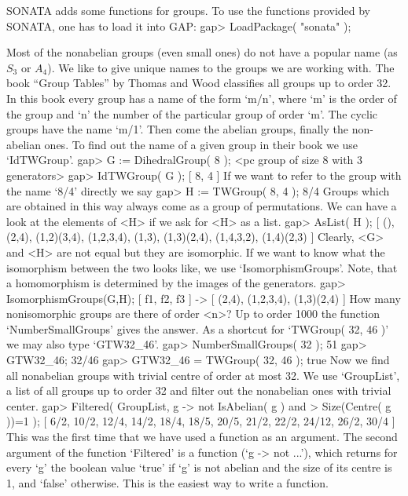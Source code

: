 %
%

SONATA adds some functions for groups. To use the functions provided by
SONATA, one has to load it into GAP:
\beginexample
    gap> LoadPackage( "sonata" );
\endexample



        Most of the nonabelian groups (even small ones) do not have a
        popular name (as $S_3$ or $A_4$). We like to give unique names to
        the groups we are working with. The book ``Group Tables'' by
        Thomas and Wood classifies all groups up to order 32. In this book
        every group has a name of the form `m/n', where `m' is the order of
        the group and `n' the number of the particular group of order `m'.
        The cyclic groups have the name `m/1'. Then come the abelian groups,
        finally the non-abelian ones. To find out the name of a given group
        in their book we use `IdTWGroup'. 
\beginexample
    gap> G := DihedralGroup( 8 );     
    <pc group of size 8 with 3 generators>
    gap> IdTWGroup( G );
    [ 8, 4 ]
\endexample
        If we want to refer to the group with the name `8/4' directly we
        say
\beginexample
    gap> H := TWGroup( 8, 4 );
    8/4
\endexample
        Groups which are obtained in this way always come as a group of
        permutations. We can have a look at the elements of <H> if we ask
        for <H> as a list.
\beginexample
    gap> AsList( H );
    [ (), (2,4), (1,2)(3,4), (1,2,3,4), (1,3), (1,3)(2,4), (1,4,3,2), 
      (1,4)(2,3) ]
\endexample
        Clearly, <G> and <H> are not equal but they are isomorphic. If we want
        to know what the isomorphism between the two looks like, we use
        `IsomorphismGroups'. Note, that a homomorphism is determined by the
        images of the generators. 
\beginexample
    gap> IsomorphismGroups(G,H);
    [ f1, f2, f3 ] -> [ (2,4), (1,2,3,4), (1,3)(2,4) ]
\endexample
        How many nonisomorphic groups are there of order <n>? Up to order
        1000 the function `NumberSmallGroups' gives the answer. As a shortcut
        for `TWGroup( 32, 46 )' we may also type `GTW32_46'.
\beginexample
    gap> NumberSmallGroups( 32 );
    51
    gap> GTW32_46;
    32/46
    gap> GTW32_46 = TWGroup( 32, 46 );
    true
\endexample
        Now we find all nonabelian groups with trivial centre of order at most
        32. We use `GroupList', a list of all groups up to order 32 and filter
        out the nonabelian ones with trivial center.
\beginexample
    gap> Filtered( GroupList, g -> not IsAbelian( g ) and
    >                              Size(Centre( g ))=1 );
    [ 6/2, 10/2, 12/4, 14/2, 18/4, 18/5, 20/5, 21/2, 22/2, 24/12, 26/2, 
      30/4 ]
\endexample
        This was the first time that we have used a function as an argument.
        The second argument of the function `Filtered' is a function
        (`g -> not ...'), which returns for every `g' the boolean value `true'
        if `g' is not abelian and the size of its centre is 1, and `false'
        otherwise. This is the easiest way to write a function.

